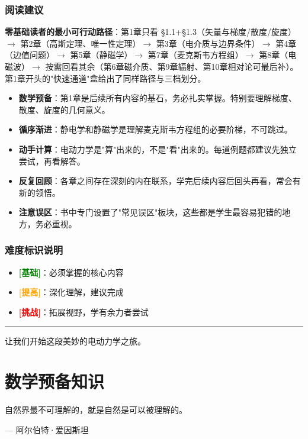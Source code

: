 \documentclass[11pt,a4paper,openany,oneside]{book}
\begin{document}
\subsection*{阅读建议}

\textbf{零基础读者的最小可行动路径}：第1章只看 \S1.1+\S1.3（矢量与梯度/散度/旋度）$\to$ 第2章（高斯定理、唯一性定理）$\to$ 第3章（电介质与边界条件）$\to$ 第4章（边值问题）$\to$ 第5章（静磁学）$\to$ 第7章（麦克斯韦方程组）$\to$ 第8章（电磁波）$\to$ 按需回看其余（第6章磁介质、第9章辐射、第10章相对论可最后补）。第1章开头的"快速通道"盒给出了同样路径与三档划分。

\begin{itemize}
\item \textbf{数学预备}：第1章是后续所有内容的基石，务必扎实掌握。特别要理解梯度、散度、旋度的几何意义。
\item \textbf{循序渐进}：静电学和静磁学是理解麦克斯韦方程组的必要阶梯，不可跳过。
\item \textbf{动手计算}：电动力学是"算"出来的，不是"看"出来的。每道例题都建议先独立尝试，再看解答。
\item \textbf{反复回顾}：各章之间存在深刻的内在联系，学完后续内容后回头再看，常会有新的领悟。
\item \textbf{注意误区}：书中专门设置了"常见误区"板块，这些都是学生最容易犯错的地方，务必重视。
\end{itemize}

\subsection*{难度标识说明}

\begin{itemize}
\item \textcolor{green}{\textbf{[基础]}}：必须掌握的核心内容
\item \textcolor{orange}{\textbf{[提高]}}：深化理解，建议完成
\item \textcolor{red}{\textbf{[挑战]}}：拓展视野，学有余力者尝试
\end{itemize}

\vspace{1em}
\noindent\rule{\textwidth}{0.4pt}
\vspace{1em}

让我们开始这段美妙的电动力学之旅。


\chapter{数学预备知识}
\epigraph{自然界最不可理解的，就是自然是可以被理解的。}{--- 阿尔伯特·爱因斯坦}
\end{document}
